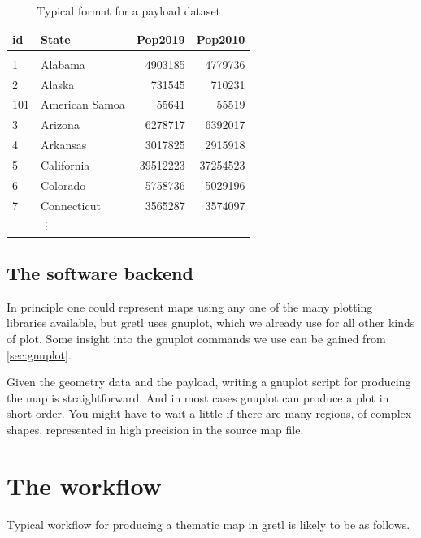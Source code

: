 \documentclass{article}
\begin{document}
\begin{table}[htbp]
\begin{center}
\begin{tabular}{llrr}
  id	& State & Pop2019 & Pop2010 \\
  \hline \\ [-1.75ex]
  1	& Alabama	& 4903185	& 4779736  \\
  2     & Alaska	& 731545	& 710231   \\
  101   & American Samoa	& 55641	& 55519	  \\
  3	& Arizona	& 6278717	& 6392017  \\
  4	& Arkansas	& 3017825	& 2915918  \\
  5	& California	& 39512223	& 37254523 \\
  6	& Colorado	& 5758736	& 5029196  \\
  7	& Connecticut	& 3565287	& 3574097  \\
                & \vdots & \\
\end{tabular}
\end{center}
\caption{Typical format for a payload dataset}
\label{tab:payload}
\end{table}

\subsection{The software backend}
\label{sec:software}

In principle one could represent maps using any one of the many
plotting libraries available, but gretl uses \textsf{gnuplot}, which
we already use for all other kinds of plot. Some insight into the
\textsf{gnuplot} commands we use can be gained from \ref{sec:gnuplot}.

Given the geometry data and the payload, writing a \textsf{gnuplot}
script for producing the map is straightforward. And in most cases
\textsf{gnuplot} can produce a plot in short order. You might have to
wait a little if there are many regions, of complex shapes,
represented in high precision in the source map file.

\section{The workflow}
\label{sec:workflow}

Typical workflow for producing a thematic map in gretl is likely to be
as follows.
\end{document}
